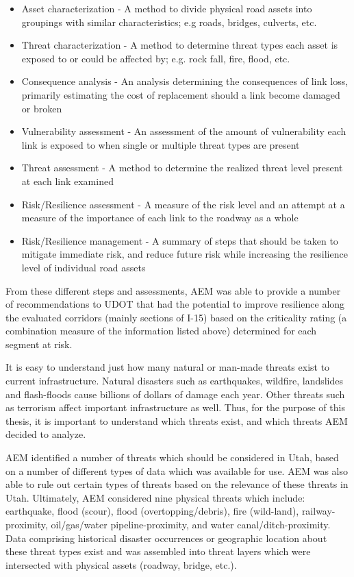\begin{itemize}
	\item Asset characterization - A method to divide physical road assets into
	groupings with similar characteristics; e.g roads, bridges, culverts, etc.
	\item Threat characterization - A method to determine threat types each asset
	is exposed to or could be affected by; e.g. rock fall, fire, flood, etc.
	\item Consequence analysis - An analysis determining the consequences of link
	loss, primarily estimating the cost of replacement should a link become
	damaged or broken
	\item Vulnerability assessment - An assessment of the amount of vulnerability
	each link is exposed to when single or multiple threat types are present
	\item Threat assessment - A method to determine the realized threat level
	present at each link examined
	\item Risk/Resilience assessment - A measure of the risk level and an attempt
	at a measure of the importance of each link to the roadway as a whole
	\item Risk/Resilience management - A summary of steps that should be taken to
	mitigate immediate risk, and reduce future risk while increasing the
	resilience level of individual road assets
\end{itemize}

From these different steps and assessments,
AEM was able to provide a number of recommendations to UDOT that had the
potential to improve
resilience along the evaluated corridors (mainly sections of I-15)
based on the criticality rating (a combination measure of the information
listed above) determined for each segment at risk.

It is easy to understand just how many natural or man-made threats exist to
current infrastructure. Natural disasters such as earthquakes, wildfire,
landslides and flash-floods cause billions of dollars of damage each year.
Other threats such as terrorism affect important infrastructure as well.
Thus, for the purpose of this thesis, it is important to understand which
threats exist, and which threats AEM decided to analyze.

AEM identified a number of threats which should be considered in Utah, based
on a number of different types of data which was available for use. AEM was
also able to rule out certain types of threats based on the relevance of these
threats in Utah. Ultimately, AEM considered nine physical threats which
include: earthquake, flood (scour), flood
(overtopping/debris), fire
(wild-land), railway-proximity, oil/gas/water pipeline-proximity, and water
canal/ditch-proximity. Data comprising historical disaster occurrences or
geographic location about these threat types exist and was assembled into
threat layers which were intersected with physical assets (roadway,
bridge, etc.).

